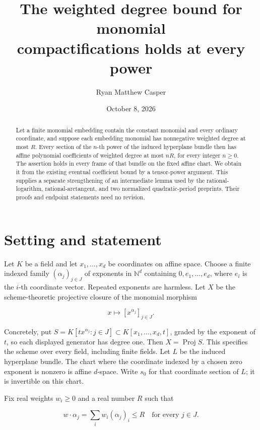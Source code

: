 \documentclass[11pt]{article}
\title{The weighted degree bound for monomial\\compactifications holds at every power}
\author{Ryan Matthew Casper}
\date{October 8, 2026}
\begin{document}
\maketitle

\begin{abstract}

Let a finite monomial embedding contain the constant monomial and every ordinary coordinate, and suppose each embedding monomial has nonnegative weighted degree at most \(R\). Every section of the \(n\)-th power of the induced hyperplane bundle then has affine polynomial coefficients of weighted degree at most \(nR\), for every integer \(n\geq0\). The assertion holds in every frame of that bundle on the fixed affine chart. We obtain it from the existing eventual coefficient bound by a tensor-power argument. This supplies a separate strengthening of an intermediate lemma used by the rational-logarithm, rational-arctangent, and two normalized quadratic-period preprints. Their proofs and endpoint statements need no revision.

\end{abstract}

\section{Setting and statement}

Let \(K\) be a field and let \(x_1,\ldots,x_d\) be coordinates on affine space. Choose a finite indexed family \((\alpha_j)_{j\in J}\) of exponents in \(\mathbb N^d\) containing \(0,e_1,\ldots,e_d\), where \(e_i\) is the \(i\)-th coordinate vector. Repeated exponents are harmless. Let \(X\) be the scheme-theoretic projective closure of the monomial morphism

\[
x\longmapsto [x^{\alpha_j}]_{j\in J}.
\]

Concretely, put \(S=K[t x^{\alpha_j}:j\in J]\subset K[x_1,\ldots,x_d,t]\), graded by the exponent of \(t\), so each displayed generator has degree one. Then \(X=\operatorname{Proj}S\). This specifies the scheme over every field, including finite fields. Let \(L\) be the induced hyperplane bundle. The chart where the coordinate indexed by a chosen zero exponent is nonzero is affine \(d\)-space. Write \(s_0\) for that coordinate section of \(L\); it is invertible on this chart.

Fix real weights \(w_i\geq0\) and a real number \(R\) such that

\[
w\cdot\alpha_j=\sum_i w_i(\alpha_j)_i\leq R
\quad\text{for every }j\in J.
\]
\end{document}

